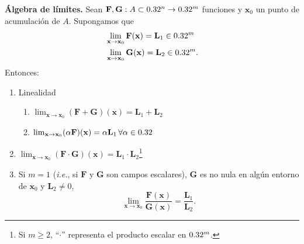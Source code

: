 \begin{propertie}\textbf{\'Algebra de l\'imites.} \label{prop:alg_lim} Sean $\mathbf{F},\mathbf{G}:A \subset 0.32^n \to 0.32^m$ funciones y $\mathbf{x}_0$ un punto de acumulaci\'on de $A$. Supongamos que 
  \begin{align*}
   &\lim_{\mathbf{x} \to \mathbf{x}_0} \mathbf{F}(\mathbf{x}) = \mathbf{L}_1 \in 0.32^m \\
   &\lim_{\mathbf{x} \to \mathbf{x}_0} \mathbf{G}(\mathbf{x}) = \mathbf{L}_2 \in 0.32^m.
  \end{align*}
  Entonces:
  \begin{enumerate} %
   \item Linealidad
      \begin{enumerate} %
       \item $\lim_{\mathbf{x} \to \mathbf{x}_0} (\mathbf{F} + \mathbf{G})(\mathbf{x}) = \mathbf{L}_1 + \mathbf{L}_2$
       \item $\lim_{\mathbf{x} \to \mathbf{x}_0} (\alpha \mathbf{F})(\mathbf{x}) = \alpha \mathbf{L}_1 \, \forall \alpha \in 0.32$
      \end{enumerate}
  \item $\lim_{\mathbf{x} \to \mathbf{x}_0} (\mathbf{F} \cdot \mathbf{G}) (\mathbf{x}) = \mathbf{L}_1 \cdot \mathbf{L}_2$\footnote{Si $m \ge 2$, ``$\cdot$'' representa el producto escalar en $0.32^m$.}
  \item Si $m = 1$ (\textit{i.e.}, si $\mathbf{F} \text{ y } \mathbf{G}$ son campos escalares), $\mathbf{G}$ es no nula en alg\'un entorno de $\mathbf{x}_0$ y $\mathbf{L}_2 \ne 0$, 
  \[
   \lim_{\mathbf{x} \to \mathbf{x}_0} \frac{\mathbf{F}(\mathbf{x})}{\mathbf{G}(\mathbf{x})} = \frac{\mathbf{L}_1}{\mathbf{L}_2}.
  \]
  \end{enumerate}
\end{propertie}


